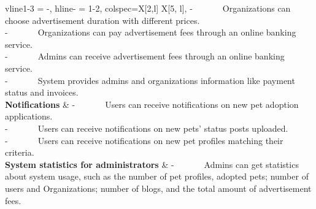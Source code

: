 \begin{longtblr}[
                caption = {Functional Requirements},
                label = {tblr:func_req},
        ]{
                vline{1-3} = {-}{},
                hline{-} = {1-2}{},
                colspec={X[2,l] X[5, l]},
        }
{                        -~~~~~~~Organizations can choose advertisement duration with different prices.
        \\-~~~~~~~Organizations can pay advertisement fees through an online banking service.
        \\-~~~~~~~Admins can receive advertisement fees through an online banking service.
        \\-~~~~~~~System provides admins and organizations information like payment status and invoices.
        }                                                                     \\
        \textbf{Notifications}                        & {
                        -~~~~~~~Users can receive notifications on new pet adoption applications.
        \\-~~~~~~~Users can receive notifications on new pets’ status posts uploaded.
        \\-~~~~~~~Users can receive notifications on new pet profiles matching their criteria.
        }                                                                     \\
        \textbf{System statistics for administrators} & {
                        -~~~~~~~Admins can get statistics about system usage, such as the number of pet profiles, adopted pets; number of users and Organizations; number of blogs, and the total amount of advertisement fees.
        }                                                                     \\
\end{longtblr}
